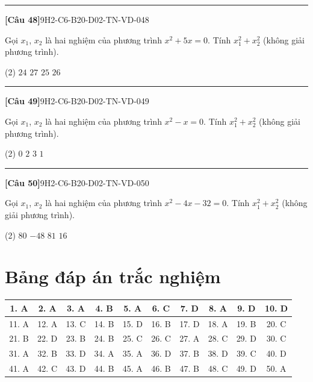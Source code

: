 \documentclass[12pt,a4paper]{article}
\newif\ifloigiai
\newenvironment{cauhoi}[2]{%
  \par\medskip\noindent\rule{\textwidth}{0.4pt}\par\nopagebreak
  \noindent\textbf{[#1]}\hfill{\scriptsize\ttfamily #2}\par\nopagebreak\smallskip}{\par}
\newcommand{\dapan}[1]{\ifloigiai\par\smallskip\noindent\textit{Đáp án:} \textbf{#1}\par\fi}
\begin{document}
\begin{cauhoi}{Câu 48}{9H2-C6-B20-D02-TN-VD-048}
Gọi $x_1$, $x_2$ là hai nghiệm của phương trình $x^{2}+5x=0$. Tính $x_1^{2}+x_2^{2}$ (không giải phương trình).
\begin{tasks}(2)
\task $24$
\task $27$
\task $25$
\task $26$
\end{tasks}
\dapan{C}
\end{cauhoi}
\begin{cauhoi}{Câu 49}{9H2-C6-B20-D02-TN-VD-049}
Gọi $x_1$, $x_2$ là hai nghiệm của phương trình $x^{2}-x=0$. Tính $x_1^{2}+x_2^{2}$ (không giải phương trình).
\begin{tasks}(2)
\task $0$
\task $2$
\task $3$
\task $1$
\end{tasks}
\dapan{D}
\end{cauhoi}
\begin{cauhoi}{Câu 50}{9H2-C6-B20-D02-TN-VD-050}
Gọi $x_1$, $x_2$ là hai nghiệm của phương trình $x^{2}-4x-32=0$. Tính $x_1^{2}+x_2^{2}$ (không giải phương trình).
\begin{tasks}(2)
\task $80$
\task $-48$
\task $81$
\task $16$
\end{tasks}
\dapan{A}
\end{cauhoi}
\clearpage\section*{Bảng đáp án trắc nghiệm}
\begin{center}\begin{tabular}{|c|c|c|c|c|c|c|c|c|c|}
\hline
1. A & 2. A & 3. A & 4. B & 5. A & 6. C & 7. D & 8. A & 9. D & 10. D\\\hline
11. A & 12. A & 13. C & 14. B & 15. D & 16. B & 17. D & 18. A & 19. B & 20. C\\\hline
21. B & 22. D & 23. B & 24. B & 25. C & 26. C & 27. A & 28. C & 29. D & 30. C\\\hline
31. A & 32. B & 33. D & 34. A & 35. A & 36. D & 37. B & 38. D & 39. C & 40. D\\\hline
41. A & 42. C & 43. D & 44. B & 45. A & 46. B & 47. B & 48. C & 49. D & 50. A\\\hline
\end{tabular}\end{center}
\end{document}
